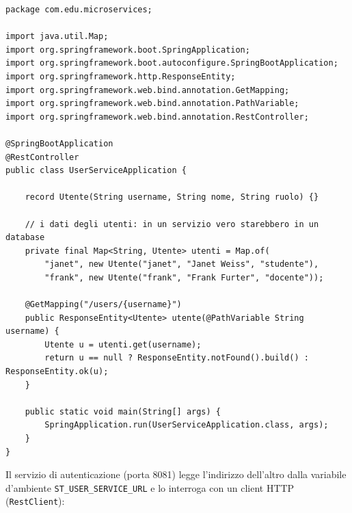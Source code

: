 \begin{lstlisting}[style=java, name=UserServiceApplication.java]
package com.edu.microservices;

import java.util.Map;
import org.springframework.boot.SpringApplication;
import org.springframework.boot.autoconfigure.SpringBootApplication;
import org.springframework.http.ResponseEntity;
import org.springframework.web.bind.annotation.GetMapping;
import org.springframework.web.bind.annotation.PathVariable;
import org.springframework.web.bind.annotation.RestController;

@SpringBootApplication
@RestController
public class UserServiceApplication {

    record Utente(String username, String nome, String ruolo) {}

    // i dati degli utenti: in un servizio vero starebbero in un database
    private final Map<String, Utente> utenti = Map.of(
        "janet", new Utente("janet", "Janet Weiss", "studente"),
        "frank", new Utente("frank", "Frank Furter", "docente"));

    @GetMapping("/users/{username}")
    public ResponseEntity<Utente> utente(@PathVariable String username) {
        Utente u = utenti.get(username);
        return u == null ? ResponseEntity.notFound().build() : ResponseEntity.ok(u);
    }

    public static void main(String[] args) {
        SpringApplication.run(UserServiceApplication.class, args);
    }
}
\end{lstlisting}

Il servizio di autenticazione (porta 8081) legge l'indirizzo dell'altro dalla variabile d'ambiente
\texttt{ST\_USER\_SERVICE\_URL} e lo interroga con un client HTTP (\texttt{RestClient}):

